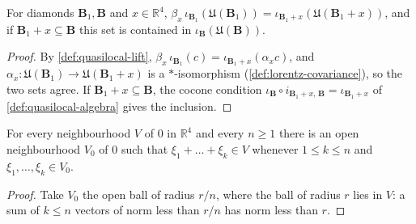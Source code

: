 \begin{lemma}
    \label{lmm:translate-local-subalgebra}
    \leanok
    For diamonds $\mathbf{B}_1, \mathbf{B}$ and $x \in \mathbb{R}^4$, $\beta_x\,\iota_{\mathbf{B}_1}(\mathfrak{U}(\mathbf{B}_1)) = \iota_{\mathbf{B}_1 + x}(\mathfrak{U}(\mathbf{B}_1 + x))$, and if $\mathbf{B}_1 + x \subseteq \mathbf{B}$ this set is contained in $\iota_{\mathbf{B}}(\mathfrak{U}(\mathbf{B}))$.
\end{lemma}
\begin{proof}
    \leanok
    By \ref{def:quasilocal-lift}, $\beta_x\,\iota_{\mathbf{B}_1}(c) = \iota_{\mathbf{B}_1 + x}(\alpha_x c)$, and $\alpha_x : \mathfrak{U}(\mathbf{B}_1) \to \mathfrak{U}(\mathbf{B}_1 + x)$ is a $*$-isomorphism (\ref{def:lorentz-covariance}), so the two sets agree. If $\mathbf{B}_1 + x \subseteq \mathbf{B}$, the cocone condition $\iota_{\mathbf{B}} \circ i_{\mathbf{B}_1 + x,\,\mathbf{B}} = \iota_{\mathbf{B}_1 + x}$ of \ref{def:quasilocal-algebra} gives the inclusion.
\end{proof}

\begin{lemma}
    \label{lmm:neighbourhood-partial-sums}
    \leanok
    For every neighbourhood $V$ of $0$ in $\mathbb{R}^4$ and every $n \ge 1$ there is an open neighbourhood $V_0$ of $0$ such that $\xi_1 + \dots + \xi_k \in V$ whenever $1 \le k \le n$ and $\xi_1, \dots, \xi_k \in V_0$.
\end{lemma}
\begin{proof}
    \leanok
    Take $V_0$ the open ball of radius $r/n$, where the ball of radius $r$ lies in $V$: a sum of $k \le n$ vectors of norm less than $r/n$ has norm less than $r$.
\end{proof}


